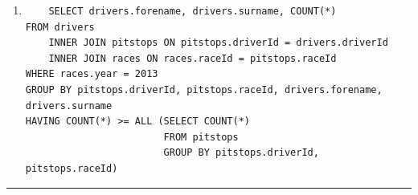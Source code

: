 \documentclass[a4paper]{article}
\begin{document}
\begin{enumerate}
\begin{verbatim}
    \end{verbatim}

    \item %
    \begin{verbatim}    
    SELECT drivers.forename, drivers.surname, COUNT(*)
FROM drivers
	INNER JOIN pitstops ON pitstops.driverId = drivers.driverId
    INNER JOIN races ON races.raceId = pitstops.raceId
WHERE races.year = 2013
GROUP BY pitstops.driverId, pitstops.raceId, drivers.forename, drivers.surname
HAVING COUNT(*) >= ALL (SELECT COUNT(*)
                        FROM pitstops
                       	GROUP BY pitstops.driverId, pitstops.raceId)  
    \end{verbatim}
\end{enumerate}


\vspace{2em}
\hrule
\doclicenseThis
\end{document}
